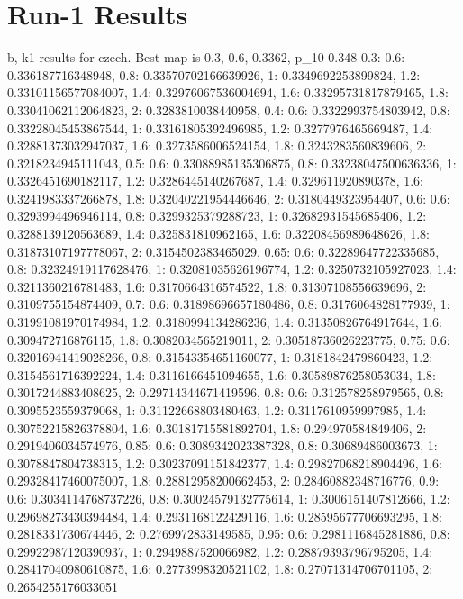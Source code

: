 \documentclass[a4paper]{article}
\begin{document}
\section{Run-1 Results}
b, k1 results for czech. Best map is 0.3, 0.6, 0.3362, p_10 0.348
{0.3: {0.6: 0.336187716348948, 0.8: 0.33570702166639926, 1: 0.3349692253899824, 1.2: 0.33101156577084007, 1.4: 0.32976067536004694, 1.6: 0.33295731817879465, 1.8: 0.33041062112064823, 2: 0.3283810038440958}, 0.4: {0.6: 0.3322993754803942, 0.8: 0.33228045453867544, 1: 0.33161805392496985, 1.2: 0.3277976465669487, 1.4: 0.32881373032947037, 1.6: 0.3273586006524154, 1.8: 0.3243283560839606, 2: 0.3218234945111043}, 0.5: {0.6: 0.33088985135306875, 0.8: 0.33238047500636336, 1: 0.3326451690182117, 1.2: 0.3286445140267687, 1.4: 0.329611920890378, 1.6: 0.3241983337266878, 1.8: 0.32040221954446646, 2: 0.3180449323954407}, 0.6: {0.6: 0.3293994496946114, 0.8: 0.3299325379288723, 1: 0.32682931545685406, 1.2: 0.3288139120563689, 1.4: 0.325831810962165, 1.6: 0.32208456989648626, 1.8: 0.31873107197778067, 2: 0.3154502383465029}, 0.65: {0.6: 0.32289647722335685, 0.8: 0.32324919117628476, 1: 0.32081035626196774, 1.2: 0.3250732105927023, 1.4: 0.3211360216781483, 1.6: 0.3170664316574522, 1.8: 0.31307108556639696, 2: 0.3109755154874409}, 0.7: {0.6: 0.31898696657180486, 0.8: 0.3176064828177939, 1: 0.31991081970174984, 1.2: 0.3180994134286236, 1.4: 0.31350826764917644, 1.6: 0.309472716876115, 1.8: 0.3082034565219011, 2: 0.30518736026223775}, 0.75: {0.6: 0.32016941419028266, 0.8: 0.31543354651160077, 1: 0.3181842479860423, 1.2: 0.3154561716392224, 1.4: 0.3116166451094655, 1.6: 0.30589876258053034, 1.8: 0.3017244883408625, 2: 0.29714344671419596}, 0.8: {0.6: 0.312578258979565, 0.8: 0.3095523559379068, 1: 0.31122668803480463, 1.2: 0.3117610959997985, 1.4: 0.30752215826378804, 1.6: 0.30181715581892704, 1.8: 0.294970584849406, 2: 0.2919406034574976}, 0.85: {0.6: 0.3089342023387328, 0.8: 0.30689486003673, 1: 0.3078847804738315, 1.2: 0.30237091151842377, 1.4: 0.29827068218904496, 1.6: 0.29328417460075007, 1.8: 0.28812958200662453, 2: 0.28460882348716776}, 0.9: {0.6: 0.3034114768737226, 0.8: 0.30024579132775614, 1: 0.3006151407812666, 1.2: 0.29698273430394484, 1.4: 0.2931168122429116, 1.6: 0.28595677706693295, 1.8: 0.2818331730674446, 2: 0.2769972833149585}, 0.95: {0.6: 0.2981116845281886, 0.8: 0.29922987120390937, 1: 0.2949887520066982, 1.2: 0.28879393796795205, 1.4: 0.28417040980610875, 1.6: 0.2773998320521102, 1.8: 0.27071314706701105, 2: 0.2654255176033051}}
\end{document}
